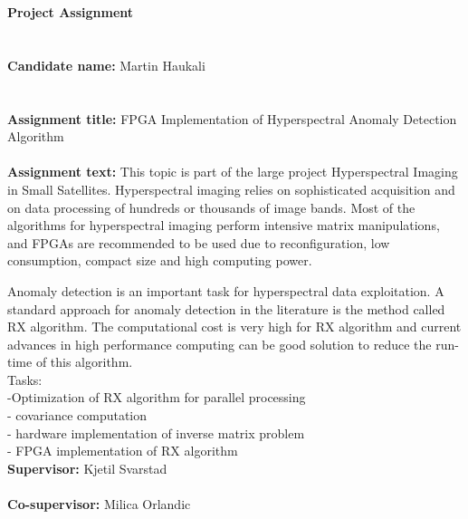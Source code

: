 \newpage

\Huge{\textbf{Project Assignment}}
\\
\\
\\
\small
\textbf{Candidate name: }  Martin Haukali
\\
\\
\\
\textbf{Assignment title:}  FPGA Implementation of Hyperspectral Anomaly Detection Algorithm
\\
\\
\textbf{ Assignment text: }
This topic is part of the large project Hyperspectral Imaging in Small Satellites. Hyperspectral imaging relies
on sophisticated acquisition and on data processing of hundreds or thousands of image bands. Most of the
algorithms for hyperspectral imaging perform intensive matrix manipulations, and
FPGAs are recommended to be used due to reconfiguration, low consumption, compact size and high
computing power.

Anomaly detection is an important task for hyperspectral data exploitation.
A standard approach for anomaly detection in the literature is the method called RX algorithm.
The computational cost is very high for RX algorithm and current advances
in high performance computing can be good solution to reduce the run- time of this algorithm.\\

Tasks:\\
-Optimization of RX algorithm for parallel processing\\
- covariance computation\\
- hardware implementation of inverse matrix problem\\
- FPGA implementation of RX algorithm \\


\textbf{Supervisor:  }Kjetil Svarstad 
\\
\\
\textbf{Co-supervisor: }Milica Orlandic